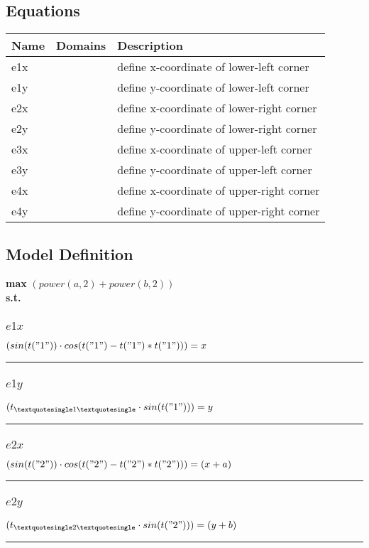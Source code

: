\documentclass[11pt]{article}
\begin{document}
\subsection*{Equations}
\begin{tabularx}{\textwidth}{| l | l | X |}
\hline
\textbf{Name} & \textbf{Domains} & \textbf{Description}\\
\hline
\endhead

e1x &  & define x-coordinate of lower-left corner\\
e1y &  & define y-coordinate of lower-left corner\\
e2x &  & define x-coordinate of lower-right corner\\
e2y &  & define y-coordinate of lower-right corner\\
e3x &  & define x-coordinate of upper-left corner\\
e3y &  & define y-coordinate of upper-left corner\\
e4x &  & define x-coordinate of upper-right corner\\
e4y &  & define y-coordinate of upper-right corner\\
\hline
\end{tabularx}
\subsection*{Model Definition}
\textbf{max} $(power(a,2) + power(b,2))$\\
\textbf{s.t.}
\subsubsection*{$e1x$}
$
(sin(t("1")) \cdot cos(t("1") - t("1") * t("1"))) = x
$
\vspace{5pt}
\hrule
\subsubsection*{$e1y$}
$
(t_{\textquotesingle 1 \textquotesingle} \cdot sin(t("1"))) = y
$
\vspace{5pt}
\hrule
\subsubsection*{$e2x$}
$
(sin(t("2")) \cdot cos(t("2") - t("2") * t("2"))) = (x + a)
$
\vspace{5pt}
\hrule
\subsubsection*{$e2y$}
$
(t_{\textquotesingle 2 \textquotesingle} \cdot sin(t("2"))) = (y + b)
$
\vspace{5pt}
\hrule
\end{document}
